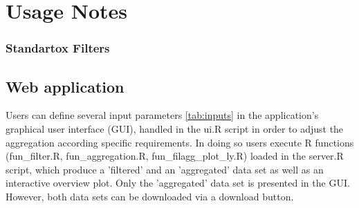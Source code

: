 \section*{Usage Notes}

\subsubsection*{Standartox Filters}





\subsection*{Web application}

Users can define several input parameters \ref{tab:inputs} in the application's graphical user interface (GUI), handled in the ui.R script in order to adjust the aggregation according specific requirements. In doing so users execute R functions (fun\_filter.R, fun\_aggregation.R, fun\_filagg\_plot\_ly.R) loaded in the server.R script, which produce a 'filtered' and an 'aggregated' data set as well as an interactive overview plot. Only the 'aggregated' data set is presented in the GUI. However, both data sets can be downloaded via a download button.




